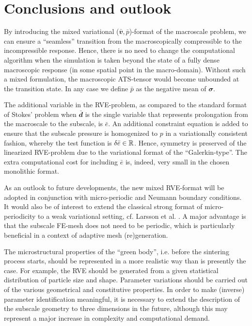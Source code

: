 \documentclass[12pt,a4paper,fleqn]{article}
\renewcommand{\ts}[1]{\mathbfit{#1}}
\begin{document}
\section{Conclusions and outlook}\label{sec:conlusions}

By introducing the mixed variational ($\bar{\ts v},\bar{p}$)-format of the macroscale problem, we can ensure a ``seamless'' transition from the macroscopically compressible to the incompressible response.
Hence, there is no need to change the computational algorithm when the simulation is taken beyond the state of a fully dense macroscopic response (in some spatial point in the macro-domain).
Without such a mixed formulation, the macroscopic ATS-tensor would become unbounded at the transition state.
In any case we define $\bar{p}$ as the negative mean of $\ts\sigma$.

The additional variable in the RVE-problem, as compared to the standard format of Stokes' problem when $\bar{\ts d}$ is the single variable that represents prolongation from the macroscale to the subscale, is $\bar e$. An additional constraint equation is added to ensure that the subscale pressure is homogenized to $p$ in a variationally consistent fashion, whereby the test function is $\delta\bar e\in\mathbb{R}$.
Hence, symmetry is preserved of  the linearized RVE-problem due to the variational format of the ``Galerkin-type''.
The extra computational cost for including $\bar e$ is, indeed, very small in the chosen monolithic format.

As an outlook to future developments, the new mixed RVE-format will be adopted in conjunction with micro-periodic and Neumann boundary conditions.
It would also be of interest to extend the classical strong format of micro-periodicity to a weak variational setting, cf. Larsson et al. \cite{Larsson_etal2011}.
A major advantage is that the subscale FE-mesh does not need to be periodic, which is particularly beneficial in a context of adaptive mesh (re)generation.

The microstructural properties of the ``green body'', i.e. before the sintering process starts, should be represented in a more realistic way than is presently the case.
For example, the RVE should be generated from a given statistical distribution of particle size and shape.
Parameter variations should be carried out of the various geometrical and constitutive properties.
In order to make (inverse) parameter identification meaningful, it is necessary to extend the description of the subscale geometry to three dimensions in the future, although this may represent a major increase in complexity and computational demand.
\end{document}
